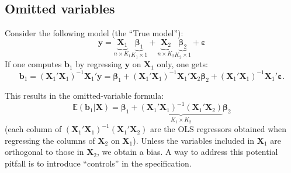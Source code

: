 \documentclass[
  12pt,
]{book}
\theoremstyle{definition}
\theoremstyle{definition}
\theoremstyle{definition}
\theoremstyle{definition}
\theoremstyle{remark}
\begin{document}
\hypertarget{Omitted}{%
\subsection{Omitted variables}\label{Omitted}}

Consider the following model (the ``True model''):
\[
\mathbf{y} = \underbrace{\mathbf{X}_1}_{n \times K_1}\underbrace{\boldsymbol\beta_1}_{K_1 \times 1} + \underbrace{\mathbf{X}_2}_{n\times K_2}\underbrace{\boldsymbol\beta_2}_{K_2 \times 1} + \boldsymbol\varepsilon
\]
If one computes \(\mathbf{b}_1\) by regressing \(\mathbf{y}\) on \(\mathbf{X}_1\) only, one gets:
\[
\mathbf{b}_1 = (\mathbf{X}_1'\mathbf{X}_1)^{-1}\mathbf{X}_1'\mathbf{y} = \boldsymbol\beta_1 + (\mathbf{X}_1'\mathbf{X}_1)^{-1}\mathbf{X}_1'\mathbf{X}_2\boldsymbol\beta_2 + 
(\mathbf{X}_1'\mathbf{X}_1)^{-1}\mathbf{X}_1'\boldsymbol\varepsilon.
\]

This results in the omitted-variable formula:
\[
\boxed{\mathbb{E}(\mathbf{b}_1|\mathbf{X}) = \boldsymbol\beta_1 + \underbrace{(\mathbf{X}_1'\mathbf{X}_1)^{-1}(\mathbf{X}_1'\mathbf{X}_2)}_{K_1 \times K_2}\boldsymbol\beta_2}
\]
(each column of \((\mathbf{X}_1'\mathbf{X}_1)^{-1}(\mathbf{X}_1'\mathbf{X}_2)\) are the OLS regressors obtained when regressing the columns of \(\mathbf{X}_2\) on \(\mathbf{X}_1\)). Unless the variables included in \(\mathbf{X}_1\) are orthogonal to those in \(\mathbf{X}_2\), we obtain a bias. A way to address this potential pitfall is to introduce ``controls'' in the specification.
\end{document}

